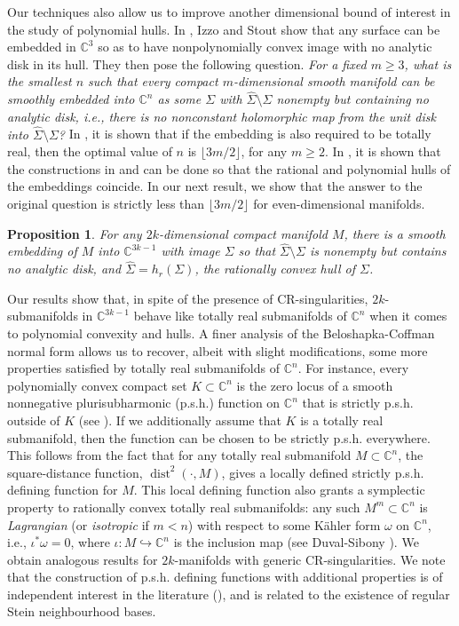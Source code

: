 \documentclass[10pt]{amsart}
\numberwithin{equation}{section}
\theoremstyle{definition}
\theoremstyle{definition}
\theoremstyle{plain}
\newtheorem{Prop}[theorem]{Proposition}
\newcommand{\om}{\omega}
\newcommand{\Cn}{\mathbb{C}^n}
\newcommand{\C} {\mathbb{C}}
\begin{document}
Our techniques also allow us to improve another dimensional bound of interest in the study of polynomial hulls. In \cite{IzSt18}, Izzo and Stout show that any surface can be embedded in $\C^3$ so as to have nonpolynomially convex image with no analytic disk in its hull. They then pose the following question. {\em For a fixed $m\geq 3$, what is the smallest $n$ such that every compact $m$-dimensional smooth manifold can be smoothly
embedded into $\Cn$ as some $\Sigma$ with $\widehat\Sigma\setminus\Sigma$ nonempty but
containing no analytic disk, i.e., there is no nonconstant holomorphic map from the unit disk into $\widehat\Sigma\setminus\Sigma$?} In \cite{ArWo17}, it is shown that if the embedding is also required to be totally real, then the optimal value of $n$ is $\lfloor{3m/2\rfloor}$, for any $m\geq 2$. In \cite{Iz18}, it is shown that the constructions in \cite{IzSt18} and \cite{ArWo17} can be done so that the rational and polynomial hulls of the embeddings coincide. In our next result, we show that the answer to the original question is strictly less than $\lfloor{3m/2\rfloor}$ for even-dimensional manifolds. 

\begin{Prop}\label{thm_anstrhull} For any $2k$-dimensional compact manifold $M$, there is a smooth embedding of $M$ into $\C^{3k-1}$ with image $\Sigma$ so that $\widehat{\Sigma}\setminus \Sigma$ is nonempty but contains no analytic disk, and $\widehat \Sigma=h_r(\Sigma)$, the rationally convex hull of $\Sigma$.	
\end{Prop}
Our results show that, in spite of the presence of CR-singularities, $2k$-submanifolds  in $\C^{3k-1}$ behave like totally real submanifolds of $\Cn$ when it comes to polynomial convexity and hulls. A finer analysis of the Beloshapka-Coffman normal form allows us to recover, albeit with slight modifications, some more properties satisfied by totally real submanifolds of $\Cn$. For instance, every polynomially convex compact set $K\subset\Cn$ is the zero locus of a smooth nonnegative plurisubharmonic (p.s.h.) function on $\Cn$ that is strictly p.s.h. outside of $K$ (see \cite[Theorem 1.3.8]{St07}). If we additionally assume that $K$ is a totally real submanifold, then the function can be chosen to be strictly p.s.h. everywhere. This follows from the fact that for any totally real submanifold $M\subset\Cn$, the square-distance function, $\operatorname{dist}^2(\cdot, M)$, gives a locally defined strictly p.s.h. defining function for $M$. This local defining function also grants a symplectic property to rationally convex totally real submanifolds: any such $M^m\subset\Cn$ is {\em Lagrangian} (or {\em isotropic} if $m<n$) with respect to some K{\" a}hler form $\om$ on $\Cn$, i.e., $\iota^*\om=0$, where  $\iota: M\hookrightarrow\Cn$ is the inclusion map (see Duval-Sibony \cite{DuSi95}). We obtain analogous results for $2k$-manifolds with generic CR-singularities. We note that the construction of p.s.h. defining functions with additional properties is of independent interest in the literature (\cite{Sl04}), and is related to the existence of regular Stein neighbourhood bases. 
\end{document}
